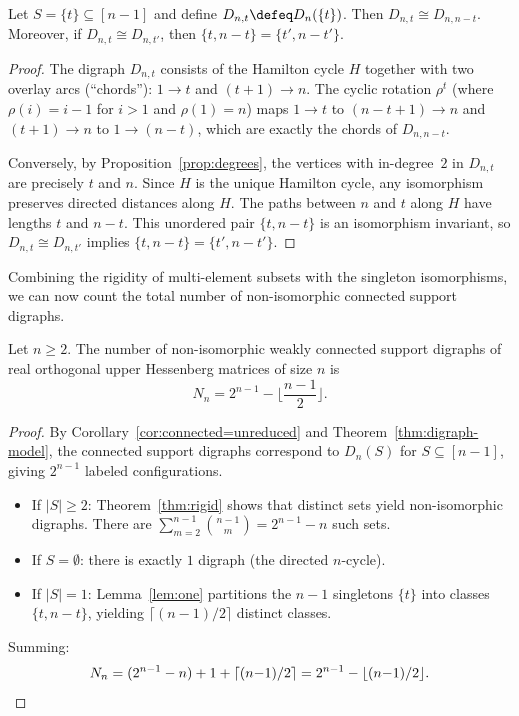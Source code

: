 \begin{lemma}\label{lem:one}
Let $S = \{t\} \subseteq [n-1]$ and define $D_{n,t} \defeq D_n(\{t\})$. Then
$D_{n,t} \cong D_{n,n-t}$. Moreover, if $D_{n,t} \cong D_{n,t'}$, then
$\{t, n - t\} = \{t', n - t'\}$.
\end{lemma}
\begin{proof}
The digraph $D_{n,t}$ consists of the Hamilton cycle $H$ together with two
overlay arcs (``chords''): $1 \to t$ and $(t{+}1) \to n$. The cyclic rotation
$\rho^t$ (where $\rho(i) = i - 1$ for $i > 1$ and $\rho(1) = n$) maps
$1 \to t$ to $(n{-}t{+}1) \to n$ and $(t{+}1) \to n$ to $1 \to (n{-}t)$,
which are exactly the chords of $D_{n,n-t}$.

Conversely, by Proposition~\ref{prop:degrees}, the vertices with in-degree~$2$
in $D_{n,t}$ are precisely $t$ and $n$. Since $H$ is the unique Hamilton cycle,
any isomorphism preserves directed distances along $H$. The paths between $n$
and $t$ along $H$ have lengths $t$ and $n - t$. This unordered pair
$\{t, n - t\}$ is an isomorphism invariant, so
$D_{n,t} \cong D_{n,t'}$ implies $\{t, n - t\} = \{t', n - t'\}$.
\end{proof}


Combining the rigidity of multi-element subsets with the singleton
isomorphisms, we can now count the total number of non-isomorphic connected
support digraphs.

\begin{theorem}\label{thm:count}
Let $n \ge 2$. The number of non-isomorphic weakly connected support digraphs
of real orthogonal upper Hessenberg matrices of size $n$ is
\[
N_n = 2^{n-1} - \Big\lfloor \frac{n-1}{2} \Big\rfloor.
\]
\end{theorem}
\begin{proof}
By Corollary~\ref{cor:connected=unreduced} and Theorem~\ref{thm:digraph-model},
the connected support digraphs correspond to $D_n(S)$ for
$S \subseteq [n-1]$, giving $2^{n-1}$ labeled configurations.

\begin{itemize}[leftmargin=2em]
\item If $|S| \ge 2$: Theorem~\ref{thm:rigid} shows that distinct sets yield
  non-isomorphic digraphs. There are
  $\sum_{m=2}^{n-1} \binom{n-1}{m} = 2^{n-1} - n$ such sets.
\item If $S = \emptyset$: there is exactly $1$ digraph (the directed $n$-cycle).
\item If $|S| = 1$: Lemma~\ref{lem:one} partitions the $n - 1$ singletons
  $\{t\}$ into classes $\{t, n - t\}$, yielding
  $\lceil(n-1)/2\rceil$ distinct classes.
\end{itemize}

Summing:
\[
N_n
= (2^{n-1} - n) + 1 + \lceil(n{-}1)/2\rceil
= 2^{n-1} - \lfloor(n{-}1)/2\rfloor. \qedhere
\]
\end{proof}
